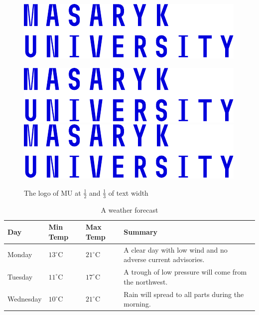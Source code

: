 \documentclass[
  digital,     %
  oneside,     %
  nosansbold,  %
  colorbold, %
  lof,         %
  lot,         %
]{fithesis4}
\begin{document}
\begin{figure}
  \begin{center}
    \begin{minipage}{.5\textwidth}
      \includegraphics[width=\textwidth]{fithesis/logo/mu/fithesis-base-english-color}
    \end{minipage}
    \hfill  %
    \begin{minipage}{.33\textwidth}
      \includegraphics[width=\textwidth]{fithesis/logo/mu/fithesis-base-english-color} \\[1em]
      \includegraphics[width=\textwidth]{fithesis/logo/mu/fithesis-base-english-color}
    \end{minipage}
  \end{center}
\caption{The logo of \acrlong{MU} at $\frac12$ and
    $\frac13$ of text width}
  \label{fig:mulogo2}
\end{figure}

\begin{table}
  \begin{tabularx}{\textwidth}{lllX}
    \toprule
    Day & Min Temp & Max Temp & Summary \\
    \midrule
    Monday & $13^{\circ}\mathrm{C}$ & $21^\circ\mathrm{C}$ & A
    clear day with low wind and no adverse current advisories. \\
    Tuesday & $11^{\circ}\mathrm{C}$ & $17^\circ\mathrm{C}$ & A
    trough of low pressure will come from the northwest. \\
    Wednesday & $10^{\circ}\mathrm{C}$ &
    $21^\circ\mathrm{C}$ & Rain will spread to all parts during the
    morning. \\
    \bottomrule
  \end{tabularx}
  \caption{A weather forecast}
  \label{tab:weather}
\end{table}
\end{document}
